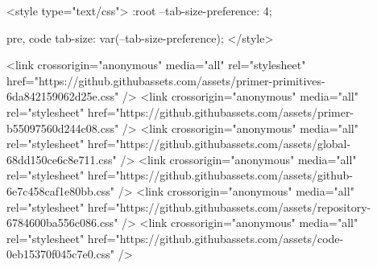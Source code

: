   <style type="text/css">
    :root {
      --tab-size-preference: 4;
    }

    pre, code {
      tab-size: var(--tab-size-preference);
    }
  </style>

    <link crossorigin="anonymous" media="all" rel="stylesheet" href="https://github.githubassets.com/assets/primer-primitives-6da842159062d25e.css" />
    <link crossorigin="anonymous" media="all" rel="stylesheet" href="https://github.githubassets.com/assets/primer-b55097560d244c08.css" />
    <link crossorigin="anonymous" media="all" rel="stylesheet" href="https://github.githubassets.com/assets/global-68dd150ce6c8e711.css" />
    <link crossorigin="anonymous" media="all" rel="stylesheet" href="https://github.githubassets.com/assets/github-6e7c458caf1e80bb.css" />
  <link crossorigin="anonymous" media="all" rel="stylesheet" href="https://github.githubassets.com/assets/repository-6784600ba556c086.css" />
<link crossorigin="anonymous" media="all" rel="stylesheet" href="https://github.githubassets.com/assets/code-0eb15370f045c7e0.css" />

  

